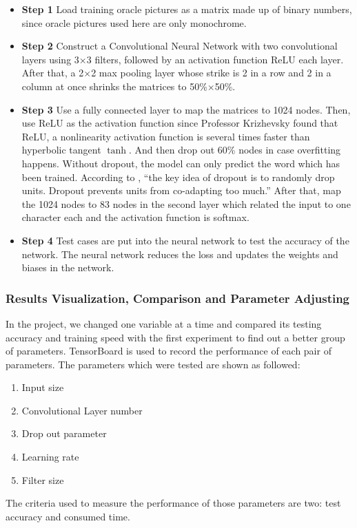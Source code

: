 \begin{itemize}
\item \textbf{Step 1} Load training oracle pictures as a matrix made up of binary numbers, since oracle pictures used here are only monochrome.
\item \textbf{Step 2} Construct a Convolutional Neural Network with two convolutional layers using 3$ \times $3 filters, followed by an activation function ReLU each layer. After that, a 2$ \times $2 max pooling layer whose strike is 2 in a row and 2 in a column at once shrinks the matrices to 50\%$ \times $50\%.
\item \textbf{Step 3} Use a fully connected layer to map the matrices to 1024 nodes. Then, use ReLU as the activation function since Professor Krizhevsky found that\cite{Krizhevsky:2012:ICD:2999134.2999257} ReLU, a nonlinearity activation function is several times faster than hyperbolic tangent $ \tanh $. And then drop out 60\% nodes in case overfitting happens. Without dropout, the model can only predict the word which has been trained. According to \cite{Srivastava:2014:DSW:2627435.2670313}, ``the key idea of dropout is to randomly drop units. Dropout prevents units from co-adapting too much.'' After that, map the 1024 nodes to 83 nodes in the second layer which related the input to one character each and the activation function is softmax.
\item \textbf{Step 4} Test cases are put into the neural network to test the accuracy of the network. The neural network reduces the loss and updates the weights and biases in the network.
\end{itemize}

\subsubsection{Results Visualization, Comparison and Parameter Adjusting}
In the project, we changed one variable at a time and compared its testing accuracy and training speed with the first experiment to find out a better group of parameters. TensorBoard is used to record the performance of each pair of parameters. The parameters which were tested are shown as followed:
\begin{enumerate}
	\item Input size
	\item Convolutional Layer number
	\item Drop out parameter
	\item Learning rate
	\item Filter size
\end{enumerate}
The criteria used to measure the performance of those parameters are two: test accuracy and consumed time.

